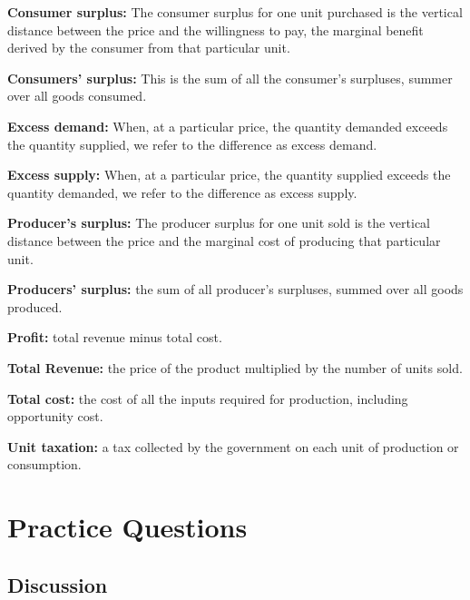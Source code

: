 \documentclass[
]{book}
\begin{document}
\textbf{Consumer surplus:} The consumer surplus for one unit purchased is the vertical distance between the price and the willingness to pay, the marginal benefit derived by the consumer from that particular unit.

\textbf{Consumers' surplus:} This is the sum of all the consumer's surpluses, summer over all goods consumed.

\textbf{Excess demand:} When, at a particular price, the quantity demanded exceeds the quantity supplied, we refer to the difference as excess demand.

\textbf{Excess supply:} When, at a particular price, the quantity supplied exceeds the quantity demanded, we refer to the difference as excess supply.

\textbf{Producer's surplus:} The producer surplus for one unit sold is the vertical distance between the price and the marginal cost of producing that particular unit.

\textbf{Producers' surplus:} the sum of all producer's surpluses, summed over all goods produced.

\textbf{Profit:} total revenue minus total cost.

\textbf{Total Revenue:} the price of the product multiplied by the number of units sold.

\textbf{Total cost:} the cost of all the inputs required for production, including opportunity cost.

\textbf{Unit taxation:} a tax collected by the government on each unit of production or consumption.

\hypertarget{practice-questions-6}{%
\section{Practice Questions}\label{practice-questions-6}}

\hypertarget{discussion-6}{%
\subsection{Discussion}\label{discussion-6}}
\end{document}
